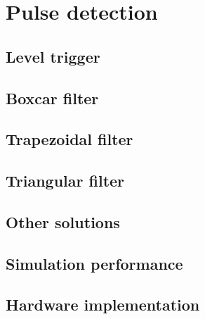 \section{Pulse detection}
\subsection{Level trigger}
\subsection{Boxcar filter}
\subsection{Trapezoidal filter}
\subsection{Triangular filter}
\subsection{Other solutions}
\subsection{Simulation performance}
\subsection{Hardware implementation}